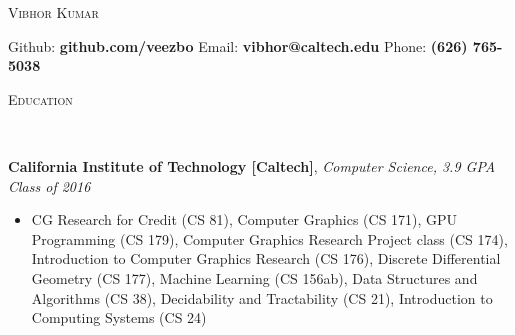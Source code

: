 \documentclass[9pt]{article}
\newenvironment{changemargin}[2]{%
  \begin{list}{}{%
    \setlength{\topsep}{0pt}%
    \setlength{\leftmargin}{#1}%
    \setlength{\rightmargin}{#2}%
    \setlength{\listparindent}{\parindent}%
    \setlength{\itemindent}{\parindent}%
    \setlength{\parsep}{\parskip}%
  }%
  \item[]}{\end{list}
}
\newcommand{\lineover}{
	\begin{changemargin}{-0.05in}{-0.05in}
		\vspace*{-8pt}
		\hrulefill \\
		\vspace*{-2pt}
	\end{changemargin}
}
\newcommand{\header}[1]{
	\begin{changemargin}{-0.5in}{-0.5in}
		\scshape{#1}\\
  	\lineover
	\end{changemargin}
}
\newenvironment{body} {
	\vspace*{-16pt}
	\begin{changemargin}{-0.25in}{-0.5in}
  }	
	{\end{changemargin}
}
\begin{document}
\begin{center} 
	{\Large \scshape Vibhor Kumar} 
\end{center}
\hspace{-6mm} Github: \textbf{github.com/veezbo} \hspace{9mm} Email: \textbf{vibhor@caltech.edu} \hspace{9mm} Phone: \textbf{(626) 765-5038}\\
\vspace{3pt}
\smallskip
\header{Education}
\smallskip
\begin{body}
	\vspace{13pt}
	\textbf{California Institute of Technology [Caltech]}{}, \emph{Computer Science, 3.9 GPA} \hfill \emph{Class of 2016}{} \\
	\begin{itemize} \itemsep -0pt
	\item CG Research for Credit (CS 81), Computer Graphics (CS 171), GPU Programming (CS 179), Computer Graphics Research Project class (CS 174), Introduction to Computer Graphics Research (CS 176), Discrete Differential Geometry (CS 177), Machine Learning (CS 156ab), Data Structures and Algorithms (CS 38), Decidability and Tractability (CS 21), Introduction to Computing Systems (CS 24)
	\end{itemize}
\end{body}

\smallskip
\end{document}
